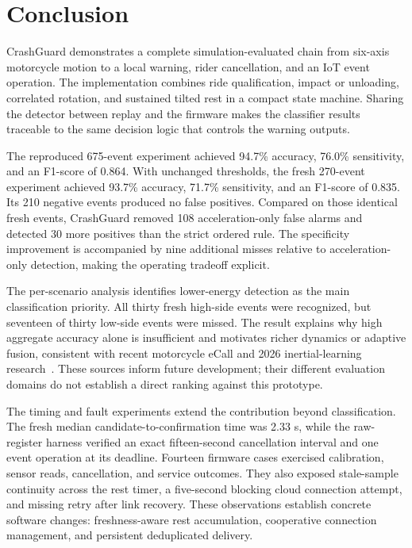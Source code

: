 \documentclass[10pt,a4paper]{article}
\begin{document}
\section{Conclusion}
CrashGuard demonstrates a complete simulation-evaluated chain from six-axis motorcycle motion to a local warning, rider cancellation, and an IoT event operation. The implementation combines ride qualification, impact or unloading, correlated rotation, and sustained tilted rest in a compact state machine. Sharing the detector between replay and the firmware makes the classifier results traceable to the same decision logic that controls the warning outputs.

The reproduced 675-event experiment achieved 94.7\% accuracy, 76.0\% sensitivity, and an F1-score of 0.864. With unchanged thresholds, the fresh 270-event experiment achieved 93.7\% accuracy, 71.7\% sensitivity, and an F1-score of 0.835. Its 210 negative events produced no false positives. Compared on those identical fresh events, CrashGuard removed 108 acceleration-only false alarms and detected 30 more positives than the strict ordered rule. The specificity improvement is accompanied by nine additional misses relative to acceleration-only detection, making the operating tradeoff explicit.

The per-scenario analysis identifies lower-energy detection as the main classification priority. All thirty fresh high-side events were recognized, but seventeen of thirty low-side events were missed. The result explains why high aggregate accuracy alone is insufficient and motivates richer dynamics or adaptive fusion, consistent with recent motorcycle eCall and 2026 inertial-learning research~\cite{ecall2025,tian2026transformer,dual2026}. These sources inform future development; their different evaluation domains do not establish a direct ranking against this prototype.

The timing and fault experiments extend the contribution beyond classification. The fresh median candidate-to-confirmation time was 2.33 s, while the raw-register harness verified an exact fifteen-second cancellation interval and one event operation at its deadline. Fourteen firmware cases exercised calibration, sensor reads, cancellation, and service outcomes. They also exposed stale-sample continuity across the rest timer, a five-second blocking cloud connection attempt, and missing retry after link recovery. These observations establish concrete software changes: freshness-aware rest accumulation, cooperative connection management, and persistent deduplicated delivery.
\end{document}
